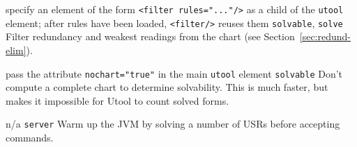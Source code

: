 \begin{itemize}
{specify an element of the form \texttt{<filter rules="..."/>}
as a child of the \texttt{utool} element; after rules have been loaded,
\texttt{<filter/>} reuses them}
{\texttt{solvable}, \texttt{solve}}
{Filter redundancy and weakest readings from the chart (see
Section~\ref{sec:redund-elim}).}

{pass the attribute \texttt{nochart="true"} in the main \texttt{utool} element}
{\texttt{solvable}}
{Don't compute a complete chart to determine solvability. This is much faster, but makes it impossible for Utool to count solved forms.}


{n/a}
{\texttt{server}}
{Warm up the JVM by solving a number of USRs before accepting commands.}




\end{itemize}





